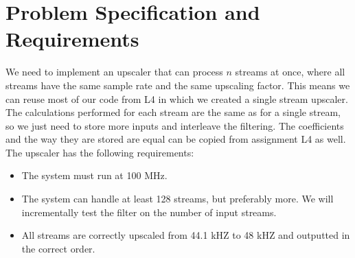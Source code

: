 \section{Problem Specification and Requirements}
We need to implement an upscaler that can process $n$ streams at once, where all streams have the same sample rate and the same upscaling factor. This means we can reuse most of our code from L4 in which we created a single stream upscaler. The calculations performed for each stream are the same as for a single stream, so we just need to store more inputs and interleave the filtering. The coefficients and the way they are stored are equal can be copied from assignment L4 as well. 
The upscaler has the following requirements:
\begin{itemize}
\item The system must run at 100 MHz.
\item The system can handle at least 128 streams, but preferably more. We will incrementally test the filter on the number of input streams.
\item All streams are correctly upscaled from 44.1 kHZ to 48 kHZ and outputted in the correct order.
\end{itemize}